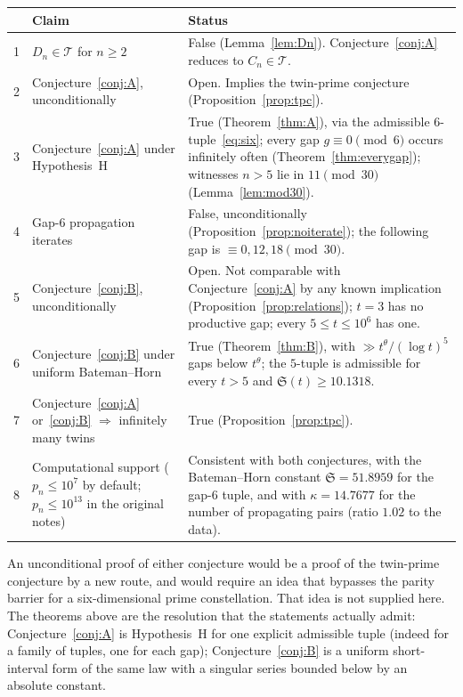 \documentclass[11pt,a4paper]{article}
\theoremstyle{definition}
\theoremstyle{remark}
\newcommand{\T}{\mathcal{T}}
\newcommand{\Sing}{\mathfrak{S}}
\begin{document}
\begin{center}
\begin{tabular}{@{}rp{5.6cm}p{8.2cm}@{}}
\toprule
& Claim & Status\\
\midrule
1 & $D_n\in\T$ for $n\ge 2$ & False (Lemma~\ref{lem:Dn}). Conjecture~\ref{conj:A} reduces to $C_n\in\T$.\\
2 & Conjecture~\ref{conj:A}, unconditionally & Open. Implies the twin-prime conjecture (Proposition~\ref{prop:tpc}).\\
3 & Conjecture~\ref{conj:A} under Hypothesis~H & True (Theorem~\ref{thm:A}), via the admissible $6$-tuple~\eqref{eq:six}; every gap $g\equiv 0\pmod 6$ occurs infinitely often (Theorem~\ref{thm:everygap}); witnesses $n>5$ lie in $11\pmod{30}$ (Lemma~\ref{lem:mod30}).\\
4 & Gap-$6$ propagation iterates & False, unconditionally (Proposition~\ref{prop:noiterate}); the following gap is $\equiv 0,12,18\pmod{30}$.\\
5 & Conjecture~\ref{conj:B}, unconditionally & Open. Not comparable with Conjecture~\ref{conj:A} by any known implication (Proposition~\ref{prop:relations}); $t=3$ has no productive gap; every $5\le t\le 10^6$ has one.\\
6 & Conjecture~\ref{conj:B} under uniform Bateman--Horn & True (Theorem~\ref{thm:B}), with $\gg t^{\theta}/(\log t)^5$ gaps below $t^{\theta}$; the $5$-tuple is admissible for every $t>5$ and $\Sing(t)\ge 10.1318$.\\
7 & Conjecture~\ref{conj:A} or~\ref{conj:B} $\Rightarrow$ infinitely many twins & True (Proposition~\ref{prop:tpc}).\\
8 & Computational support ($p_n\le 10^7$ by default; $p_n\le 10^{13}$ in the original notes) & Consistent with both conjectures, with the Bateman--Horn constant $\Sing = 51.8959$ for the gap-$6$ tuple, and with $\kappa = 14.7677$ for the number of propagating pairs (ratio $1.02$ to the data).\\
\bottomrule
\end{tabular}
\end{center}

An unconditional proof of either conjecture would be a proof of the twin-prime conjecture by a new route, and would require an idea that bypasses the parity barrier for a six-dimensional prime constellation.
That idea is not supplied here.
The theorems above are the resolution that the statements actually admit: Conjecture~\ref{conj:A} is Hypothesis~H for one explicit admissible tuple (indeed for a family of tuples, one for each gap); Conjecture~\ref{conj:B} is a uniform short-interval form of the same law with a singular series bounded below by an absolute constant.
\end{document}
